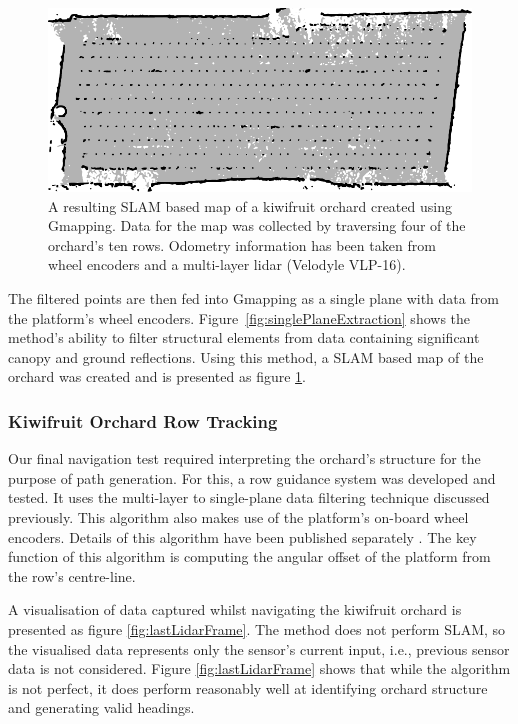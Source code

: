 \documentclass[preprint,authoryear,12pt]{elsarticle}
\begin{document}
        \begin{figure}[htb]
            \centering
            \includegraphics{imgs/gmapmap/gmapmap.pdf}
            \caption{
                A resulting SLAM based map of a kiwifruit orchard created using Gmapping.
                Data for the map was collected by traversing four of the orchard's ten rows.
                Odometry information has been taken from wheel encoders and a multi-layer lidar (Velodyle VLP-16).
            }
            \label{fig:gmapmap}
        \end{figure}

        The filtered points are then fed into Gmapping as a single plane with data from the platform's wheel encoders.
        Figure~\ref{fig:singlePlaneExtraction} shows the method's ability to filter structural elements from data containing significant canopy and ground reflections.
        Using this method, a SLAM based map of the orchard was created and is presented as figure \ref{fig:gmapmap}.


    \subsubsection{Kiwifruit Orchard Row Tracking}
        \label{sect:row_tracking}

        Our final navigation test required interpreting the orchard's structure for the purpose of path generation.
        For this, a row guidance system was developed and tested.
        It uses the multi-layer to single-plane data filtering technique discussed previously.
        This algorithm also makes use of the platform's on-board wheel encoders.
        Details of this algorithm have been published separately \citep{Bell2016}.
        The key function of this algorithm is computing the angular offset of the platform from the row's centre-line.

        A visualisation of data captured whilst navigating the kiwifruit orchard is presented as figure \ref{fig:lastLidarFrame}.
        The method does not perform SLAM, so the visualised data represents only the sensor's current input, i.e., previous sensor data is not considered.
        Figure \ref{fig:lastLidarFrame} shows that while the algorithm is not perfect, it does perform reasonably well at identifying orchard structure and generating valid headings.
\end{document}
